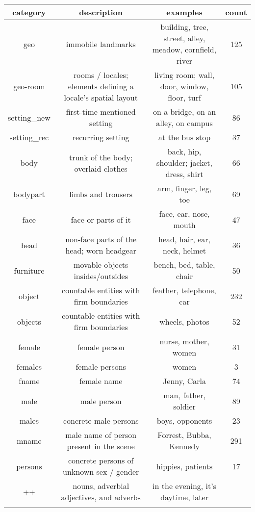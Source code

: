 \documentclass[10pt,a4paper,onecolumn]{article}
\begin{document}
\clearpage
\begin{center}
\begin{tabular}{ |c|c|c|c| }
\hline
category & description & examples & count\\
\hline
geo & immobile landmarks & building, tree, street, alley, meadow, cornfield, river & 125\\
geo-room & rooms / locales; elements defining a locale's spatial layout & living room; wall, door, window, floor, turf & 105\\
setting\_new & first-time mentioned setting & on a bridge, on an alley, on campus & 86\\
setting\_rec & recurring setting & at the bus stop & 37\\
body & trunk of the body; overlaid clothes & back, hip, shoulder; jacket, dress, shirt & 66\\
bodypart & limbs and trousers & arm, finger, leg, toe & 69\\
face & face or parts of it & face, ear, nose, mouth & 47\\
head & non-face parts of the head; worn headgear & head, hair, ear, neck, helmet & 36\\
furniture & movable objects insides/outsides & bench, bed, table, chair & 50\\
object & countable entities with firm boundaries & feather, telephone, car & 232\\
objects & countable entities with firm boundaries & wheels, photos & 52\\
female & female person & nurse, mother, women & 31\\
females & female persons & women & 3\\
fname & female name & Jenny, Carla & 74\\
male & male person & man, father, soldier & 89\\
males & concrete male persons & boys, opponents & 23\\
mname & male name of person present in the scene & Forrest, Bubba, Kennedy & 291\\
persons & concrete persons of unknown sex / gender & hippies, patients & 17\\
++ & nouns, adverbial adjectives, and adverbs & in the evening, it's daytime, later \\
\hline
\label{tab:descr-nouns-old}
\end{tabular}
\end{center}
\end{document}
